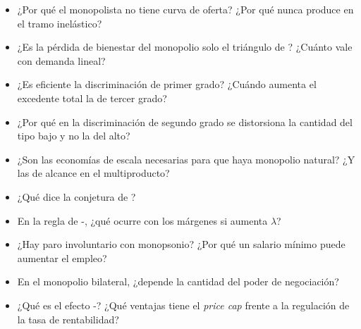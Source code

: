 \documentclass[11pt]{article}
\begin{document}
\begin{itemize}
\item ¿Por qué el monopolista no tiene curva de oferta? ¿Por qué nunca produce en el tramo inelástico?
\item ¿Es la pérdida de bienestar del monopolio solo el triángulo de ? ¿Cuánto vale con demanda lineal?
\item ¿Es eficiente la discriminación de primer grado? ¿Cuándo aumenta el excedente total la de tercer grado?
\item ¿Por qué en la discriminación de segundo grado se distorsiona la cantidad del tipo bajo y no la del alto?
\item ¿Son las economías de escala necesarias para que haya monopolio natural? ¿Y las de alcance en el multiproducto?
\item ¿Qué dice la conjetura de ?
\item En la regla de -, ¿qué ocurre con los márgenes si aumenta $\lambda$?
\item ¿Hay paro involuntario con monopsonio? ¿Por qué un salario mínimo puede aumentar el empleo?
\item En el monopolio bilateral, ¿depende la cantidad del poder de negociación?
\item ¿Qué es el efecto -? ¿Qué ventajas tiene el \emph{price cap} frente a la regulación de la tasa de rentabilidad? 
\end{itemize}

\nocite{ICEXCECO3A17,Nobel2014TiroleLecture,ViscusiHarringtonVernon2005Economics}
\bibliografia
\end{document}

